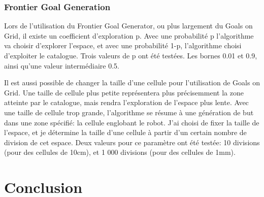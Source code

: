 \documentclass[11pt,french]{report}
\begin{document}
\subsection{Frontier Goal Generation}

Lors de l'utilisation du Frontier Goal Generator, ou plus largement du Goals on Grid, il existe un coefficient d'exploration p.
Avec une probabilité p l'algorithme va choisir d'explorer l'espace, et avec une probabilité 1-p, l'algorithme choisi d'exploiter le catalogue.
Trois valeurs de p ont été testées.
Les bornes 0.01 et 0.9, ainsi qu'une valeur intermédiaire 0.5.

Il est aussi possible de changer la taille d'une cellule pour l'utilisation de Goals on Grid.
Une taille de cellule plus petite représentera plus précisemment la zone atteinte par le catalogue, mais rendra l'exploration de l'espace plus lente.
Avec une taille de cellule trop grande, l'algorithme se résume à une génération de but dans une zone spécifié: la cellule englobant le robot.
J'ai choisi de fixer la taille de l'espace, et je détermine la taille d'une cellule à partir d'un certain nombre de division de cet espace.
Deux valeurs pour ce paramètre ont été testée: 10 divisions (pour des cellules de 10cm), et 1 000 divisions (pour des cellules de 1mm).

\chapter{Conclusion}




\end{document}
